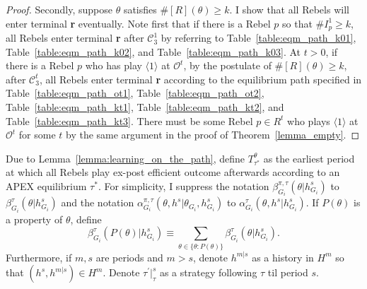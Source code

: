 \documentclass[12pt,letter]{article}
\newcommand{\Kappa}{\mathcal{C}}
\newcommand{\Omicron}{\mathcal{O}}
\theoremstyle{definition}
\theoremstyle{remark}
\theoremstyle{claim}
\begin{document}
\begin{proof}
Secondly, suppose $\theta$ satisfies $\#[R](\theta)\geq k$. I show that all Rebels will enter terminal \textbf{r} eventually. Note first that if there is a Rebel $p$ so that $\#I^1_p\geq k$, all Rebels enter terminal \textbf{r} after $\Kappa^1_3$ by referring to Table~\ref{table:eqm_path_k01}, Table~\ref{table:eqm_path_k02}, and Table~\ref{table:eqm_path_k03}. At $t>0$, if there is a Rebel $p$ who has play $\langle 1 \rangle$ at $\Omicron^t$, by the postulate of $\#[R](\theta)\geq k$, after $\Kappa^t_3$, all Rebels enter terminal \textbf{r} according to the equilibrium path specified in Table~\ref{table:eqm_path_ot1}, Table~\ref{table:eqm_path_ot2}, Table~\ref{table:eqm_path_kt1}, Table~\ref{table:eqm_path_kt2}, and Table~\ref{table:eqm_path_kt3}. There must be some Rebel $p\in R^t$ who plays $\langle 1 \rangle$ at $\Omicron^t$ for some $t$ by the same argument in the proof of Theorem~\ref{lemma_empty}.
\end{proof}


Due to Lemma~\ref{lemma:learning_on_the_path}, define $T^{\theta}_{\tau^{*}}$ as the earliest period at which all Rebels play ex-post efficient outcome afterwards according to an APEX equilibrium $\tau^{*}$.  For simplicity, I suppress the notation $\beta^{\pi,\tau}_{G_i}(\theta|h^s_{G_i})$ to $\beta^{\tau}_{G_i}(\theta|h^s_{G_i})$ and the notation $\alpha^{\pi,\tau}_{G_i}(\theta, h^{s}|\theta_{G_i},h^{s}_{G_i})$ to $\alpha^{\tau}_{G_i}(\theta, h^{s}|h^{s}_{G_i})$. If $P(\theta)$ is a property of $\theta$, define \[\beta^{\tau}_{G_i}(P(\theta)|h^s_{G_i})\equiv \sum_{\theta\in\{\theta:P(\theta)\}}\beta^{\tau}_{G_i}(\theta|h^s_{G_i}).\] Furthermore, if $m,s$ are periods and $m>s$, denote $h^{m|s}$ as a history in $H^m$ so that $(h^s,h^{m|s})\in H^m$. Denote $\tau^{'}|^s_{\tau}$ as a strategy following $\tau$ til period $s$.
\end{document}
